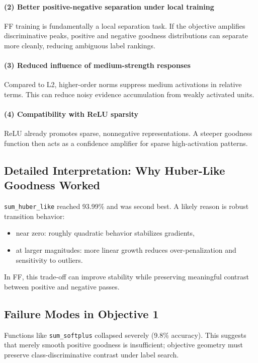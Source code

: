 \documentclass[sigconf]{acmart}
\begin{document}
\paragraph{(2) Better positive-negative separation under local training}
FF training is fundamentally a local separation task. If the objective amplifies discriminative peaks, positive and negative goodness distributions can separate more cleanly, reducing ambiguous label rankings.

\paragraph{(3) Reduced influence of medium-strength responses}
Compared to L2, higher-order norms suppress medium activations in relative terms. This can reduce noisy evidence accumulation from weakly activated units.

\paragraph{(4) Compatibility with ReLU sparsity}
ReLU already promotes sparse, nonnegative representations. A steeper goodness function then acts as a confidence amplifier for sparse high-activation patterns.

\subsection{Detailed Interpretation: Why Huber-Like Goodness Worked}
\texttt{sum\_huber\_like} reached 93.99\% and was second best. A likely reason is robust transition behavior:
\begin{itemize}
  \item near zero: roughly quadratic behavior stabilizes gradients,
  \item at larger magnitudes: more linear growth reduces over-penalization and sensitivity to outliers.
\end{itemize}
In FF, this trade-off can improve stability while preserving meaningful contrast between positive and negative passes.

\subsection{Failure Modes in Objective 1}
Functions like \texttt{sum\_softplus} collapsed severely (9.8\% accuracy). This suggests that merely smooth positive goodness is insufficient; objective geometry must preserve class-discriminative contrast under label search.
\end{document}
